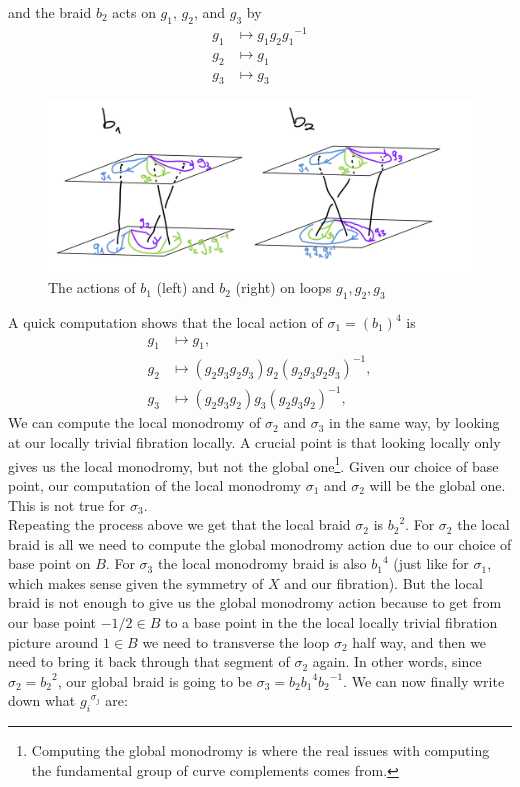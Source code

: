 \documentclass[oneside,reqno]{amsart}
\theoremstyle{definition}
\theoremstyle{definition}
\theoremstyle{definition}
\theoremstyle{definition}
\begin{document}
and the braid $b_2$ acts on $g_1$, $g_2$, and $g_3$ by
\begin{align*}
    g_1 &\mapsto g_1 g_2 {g_1}^{-1} \\
    g_2 &\mapsto g_1 \\
    g_3 &\mapsto g_3
\end{align*}
\begin{figure}[!h]
    \centering
    \includegraphics[width=14cm]{rank2exmp/braidgenerators.png}
    \caption{The actions of $b_1$ (left) and $b_2$ (right) on loops $g_1,g_2,g_3$}
    \label{braidgenaction}
\end{figure}
A quick computation shows that the local action of $\sigma_1 = (b_1)^4$ is 
\begin{align*}
    g_1 &\mapsto g_1, \\
    g_2 &\mapsto (g_2 g_3 g_2 g_3) g_2 (g_2 g_3 g_2 g_3)^{-1}, \\
    g_3 &\mapsto (g_2 g_3 g_2) g_3 (g_2 g_3 g_2)^{-1}, 
\end{align*}
We can compute the local monodromy of $\sigma_2$ and $\sigma_3$ in the same way, by looking at our locally trivial fibration locally. A crucial point is that looking locally only gives us the local monodromy, but not the global one\footnote{Computing the global monodromy is where the real issues with computing the fundamental group of curve complements comes from.}. Given our choice of base point, our computation of the local monodromy $\sigma_1$ and $\sigma_2$ will be the global one. This is not true for $\sigma_3$. \\
\newline
Repeating the process above we get that the local braid $\sigma_2$ is ${b_2}^2$. For $\sigma_2$ the local braid is all we need to compute the global monodromy action due to our choice of base point on $B$. For $\sigma_3$ the local monodromy braid is also ${b_1}^4$ (just like for $\sigma_1$, which makes sense given the symmetry of $X$ and our fibration). But the local braid is not enough to give us the global monodromy action because to get from our base point $-1/2 \in B$ to a base point in the the local locally trivial fibration picture around $1 \in B$ we need to transverse the loop $\sigma_2$ half way, and then we need to bring it back through that segment of $\sigma_2$ again. In other words, since $\sigma_2 = {b_2}^2$, our global braid is going to be $\sigma_3 = b_2 {b_1}^4 {b_2}^{-1}$. We can now finally write down what ${g_i}^{\sigma_j}$ are:
\end{document}
